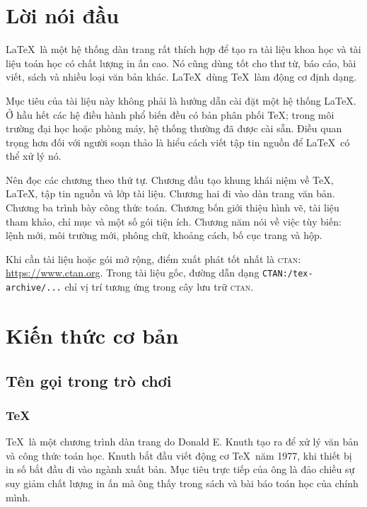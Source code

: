 \documentclass[11pt]{article}
\newcommand{\CTAN}{\textsc{ctan}}
\newcommand{\file}[1]{\texttt{#1}}
\begin{document}
\tableofcontents

\section*{Lời nói đầu}

\LaTeX\ là một hệ thống dàn trang rất thích hợp để tạo ra tài liệu khoa học và
tài liệu toán học có chất lượng in ấn cao. Nó cũng dùng tốt cho thư từ, báo cáo,
bài viết, sách và nhiều loại văn bản khác. \LaTeX\ dùng \TeX\ làm động cơ định
dạng.

Mục tiêu của tài liệu này không phải là hướng dẫn cài đặt một hệ thống
\LaTeX. Ở hầu hết các hệ điều hành phổ biến đều có bản phân phối \TeX; trong
môi trường đại học hoặc phòng máy, hệ thống thường đã được cài sẵn. Điều quan
trọng hơn đối với người soạn thảo là hiểu cách viết tập tin nguồn để \LaTeX\
có thể xử lý nó.

Nên đọc các chương theo thứ tự. Chương đầu tạo khung khái niệm về \TeX,
\LaTeX, tập tin nguồn và lớp tài liệu. Chương hai đi vào dàn trang văn bản.
Chương ba trình bày công thức toán. Chương bốn giới thiệu hình vẽ, tài liệu
tham khảo, chỉ mục và một số gói tiện ích. Chương năm nói về việc tùy biến:
lệnh mới, môi trường mới, phông chữ, khoảng cách, bố cục trang và hộp.

Khi cần tài liệu hoặc gói mở rộng, điểm xuất phát tốt nhất là \CTAN:
\url{https://www.ctan.org}. Trong tài liệu gốc, đường dẫn dạng
\file{CTAN:/tex-archive/...} chỉ vị trí tương ứng trong cây lưu trữ \CTAN.

\section{Kiến thức cơ bản}

\subsection{Tên gọi trong trò chơi}

\subsubsection{\TeX}

\TeX\ là một chương trình dàn trang do Donald E. Knuth tạo ra để xử lý văn bản
và công thức toán học. Knuth bắt đầu viết động cơ \TeX\ năm 1977, khi thiết bị
in số bắt đầu đi vào ngành xuất bản. Mục tiêu trực tiếp của ông là đảo chiều
sự suy giảm chất lượng in ấn mà ông thấy trong sách và bài báo toán học của
chính mình.
\end{document}
